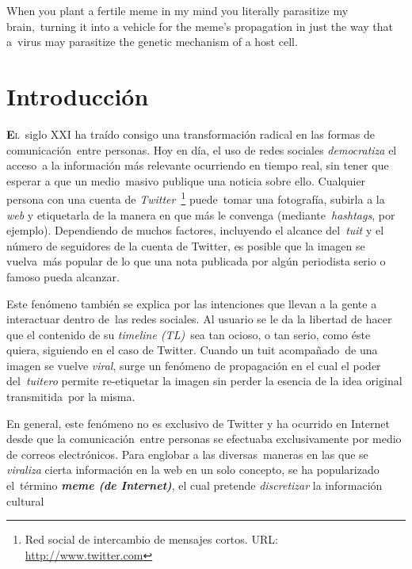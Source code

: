 \begin{savequote}[45mm]
  When you plant a fertile meme in my mind you literally parasitize my brain,\
  turning it into a vehicle for the meme's propagation in just the way that a\
  virus may parasitize the genetic mechanism of a host cell.
  \qauthor{Richard Dawkins \cite{dawkins2006}}
\end{savequote}

\chapter{Introducción}

\noindent
\lettrine[lines=2, lhang=0.33, loversize=0.25]{\textbf{E}}{l}\
siglo XXI ha traído consigo una transformación radical en las formas de comunicación\
entre personas. Hoy en día, el uso de redes sociales \emph{democratiza} el acceso\
a la información más relevante ocurriendo en tiempo real, sin tener que esperar a que un medio\
masivo publique una noticia sobre ello. Cualquier persona con una cuenta de \textit{Twitter}\
\footnote{Red social de intercambio de mensajes cortos. URL: \url{http://www.twitter.com}} puede\
tomar una fotografía, subirla a la \textit{web} y etiquetarla de la manera en que más le convenga (mediante\
\textit{hashtags}, por ejemplo). Dependiendo de muchos factores, incluyendo el alcance del\
\textit{tuit} y el número de seguidores de la cuenta de Twitter, es posible que la imagen se vuelva\
más popular de lo que una nota publicada por algún periodista serio o famoso pueda alcanzar.\par
Este fenómeno también se explica por las intenciones que llevan a la gente a interactuar dentro de\
las redes sociales. Al usuario se le da la libertad de hacer que el contenido de su \textit{timeline (TL)}\
sea tan ocioso, o tan serio, como éste quiera, siguiendo en el caso de Twitter. Cuando un tuit acompañado\
de una imagen se vuelve \emph{viral}, surge un fenómeno de propagación en el cual el poder del\
\textit{tuitero} permite re-etiquetar la imagen sin perder la esencia de la idea original transmitida\
por la misma.\par
En general, este fenómeno no es exclusivo de Twitter y ha ocurrido en Internet desde que la comunicación\
entre personas se efectuaba exclusivamente por medio de correos electrónicos. Para englobar a las diversas\
maneras en las que se \emph{viraliza} cierta información en la web en un solo concepto, se ha popularizado el\
término \emph{\textbf{meme (de Internet)}}, el cual pretende \emph{discretizar} la información cultural\

